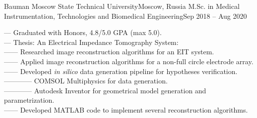 
    \resumeSubheading
      {Bauman Moscow State Technical University}{Moscow, Russia}
      {M.Sc. in Medical Instrumentation, Technologies and Biomedical Engineering}{Sep 2018 -- Aug 2020}
      \begin{itemize}[leftmargin=0in, label={}]
            \small{\item{
                {— Graduated with Honors, 4.8/5.0 GPA (max 5.0).}\\
                {— Thesis: An Electrical Impedance Tomography System:}\\
                {—— Researched image reconstruction algorithms for an EIT system.}\\
                {—— Applied image reconstruction algorithms for a non-full circle electrode array.}\\
                {—— Developed \textit{in silico} data generation pipeline for hypotheses verification.}\\
                {———— COMSOL Multiphysics for data generation.}\\
                {———— Autodesk Inventor for geometrical model generation and parametrization.}\\
                {—— Developed MATLAB code to implement several reconstruction algorithms.}
            }}
      \end{itemize}